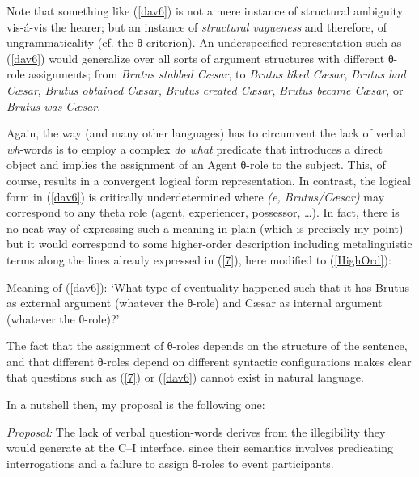 \documentclass[output=paper]{langsci/langscibook}
\begin{document}
Note that something like (\ref{dav6}) is not a mere instance of structural
ambiguity vis-\'a-vis the hearer; but an instance of
\emph{structural vagueness} and therefore, of ungrammaticality (cf.
the θ-criterion). An underspecified representation such as (\ref{dav6})
would generalize over all sorts of argument structures with different
θ-role assignments; from \emph{Brutus stabbed C\ae{}sar}, to
\emph{Brutus liked C\ae{}sar}, \emph{Brutus had C\ae{}sar}, \emph{Brutus
obtained C\ae{}sar}, \emph{Brutus created C\ae{}sar}, \emph{Brutus became
C\ae{}sar}, or \emph{Brutus was C\ae{}sar}.

Again, the way  (and many other languages) has to circumvent the lack of
verbal \emph{wh}-words is to employ a complex \emph{do what} predicate that
introduces a direct object and implies the assignment of an Agent θ-role to the
subject. This, of course, results in a convergent logical form representation.
In contrast, the logical form in (\ref{dav6}) is critically underdetermined
where \emph{\underline{\hspace{1cm}}(e, Brutus/C\ae{}sar)} may correspond to
any theta role (agent, experiencer, possessor, \ldots). In fact, there is no neat
way of expressing such a meaning in plain  (which is precisely my point)
but it would correspond to some higher-order description including
metalinguistic terms along the lines already expressed in (\ref{7}), here
modified to (\ref{HighOrd}):

\begin{exe}
\ex \label{HighOrd} Meaning of (\ref{dav6}): `What type of eventuality happened such that it has Brutus as external argument (whatever the θ-role) and C\ae{}sar as internal argument (whatever the θ-role)?'
\end{exe}

The fact that the assignment of θ-roles depends on the structure of the sentence, and that different θ-roles depend on different syntactic configurations makes clear that questions such as (\ref{7}) or (\ref{dav6}) cannot exist in natural language.

In a nutshell then, my proposal is the following one:

\begin{exe}
\ex \label{prop} \emph{Proposal:} The lack of verbal question-words derives
from the illegibility they would generate at the C--I interface, since their semantics involves predicating interrogations and a failure to assign θ-roles to event participants.
\end{exe}
\end{document}
